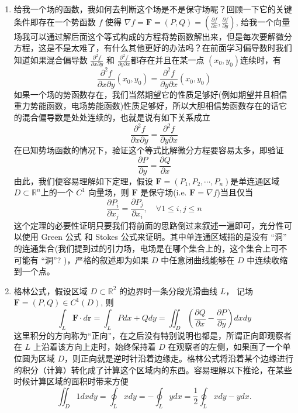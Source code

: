 \begin{enumerate}
    \item 给我一个场的函数，我如何去判断这个场是不是保守场呢？回顾一下它的关键条件即存在一个势函数 $f$ 使得 $\nabla f = \mathbf{F} = (P,Q) = (\frac{\partial f}{\partial x}, \frac{\partial f}{\partial y})$, 给我一个向量场我可以通过解后面这个等式构成的方程将势函数解出来，但是每次要解微分方程，这是不是太难了，有什么其他更好的办法吗？在前面学习偏导数时我们知道如果混合偏导数 $\frac{\partial^2f}{\partial x\partial y}$ 和 $\frac{\partial^2f}{\partial y\partial x}$都存在并且在某一点 $(x_0,y_0)$连续时，有
    \[
        \frac{\partial^2f}{\partial x\partial y}(x_0,y_0)=\frac{\partial^2f}{\partial y\partial x}(x_0,y_0)
    \]
    如果一个场的势函数存在，我们当然期望它的性质足够好(例如期望并且相信重力势能函数，电场势能函数)性质足够好，所以大胆相信势函数存在的话它的混合偏导数是处处连续的，也就是说有如下关系成立
    \[
        \frac{\partial^2f}{\partial x\partial y} = \frac{\partial^2f}{\partial y\partial x}
    \]
    在已知势场函数的情况下，验证这个等式比解微分方程要容易太多，即验证
    \[
        \frac{\partial P}{\partial y}=\frac{\partial Q}{\partial x}
    \]
    由此，我们便容易理解如下定理，假设 $\mathbf{F} = (P_1, P_2, \cdots, P_n)$是单连通区域 $D \subset \mathbb{R}^n$上的一个 $C^1$ 向量场，则 $\mathbf{F}$ 是保守场(i.e. $\mathbf{F} = \nabla f$)当且仅当
    \[
        \frac{\partial P_i}{\partial x_j}=\frac{\partial P_j}{\partial x_i},\quad\forall1\leq i,j\leq n
    \]
    这个定理的必要性证明只要我们将前面的思路倒过来叙述一遍即可，充分性可以使用 Green 公式 和 Stokes 公式来证明。其中单连通区域指的是没有 “洞” 的连通集合(我们提到过的引力场，电场是在哪个集合上的，这个集合上可不可能有 “洞”? )，严格的叙述即为如果 $D$ 中任意闭曲线能够在 $D$ 中连续收缩到一个点。

    \item 格林公式，假设区域 $D \subset \mathbb{R}^2$ 的边界时一条分段光滑曲线 $L$， 记场 $\mathbf{F} = (P, Q) \in C^1(D)$, 则
    \[
        \int_L\mathbf{F}\cdot d\mathbf{r}=\int_LPdx+Qdy=\iint_D\left(\frac{\partial Q}{\partial x}-\frac{\partial P}{\partial y}\right)dxdy
    \]
    这里积分的方向称为“正向”，在之后没有特别说明也都是，所谓正向即观察者在 $L$ 上沿着该方向上走时，始终保持着 $D$ 在观察者的左侧，如果画了一个单位圆为区域 $D$，则正向就是逆时针沿着边缘走。格林公式将沿着某个边缘进行的积分（计算）转化成了计算这个区域内的东西。容易理解以下推论，在某些时候计算区域的面积时带来方便
    \[
        \iint_D1dxdy=\oint_Lxdy=-\oint_Lydx=\frac{1}{2}\oint_Lxdy-ydx.
    \]


\end{enumerate}
